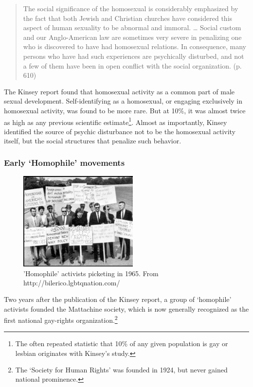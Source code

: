 \begin{quote}

The social significance of the homosexual is considerably emphasized by the fact that both Jewish and Christian churches have considered this aspect of human sexuality to be abnormal and immoral. {\ldots} Social custom and our Anglo-American law are sometimes very severe in penalizing one who is discovered to have had homosexual relations. In consequence, many persons who have had such experiences are psychically disturbed, and not a few of them have been in open conflict with the social organization. (p. 610)
\end{quote}

The Kinsey report found that homosexual activity as a common part of male sexual development. Self-identifying as a homosexual, or engaging exclusively in homosexual activity, was found to be more rare. But at 10\%, it was almost twice as high as any previous scientific estimate\footnote{The often repeated statistic that 10\% of any given population is gay or lesbian originates with Kinsey's study.}. Almost as importantly, Kinsey identified the source of psychic disturbance not to be the homosexual activity itself, but the social structures that penalize such behavior.

\subsubsection{Early `Homophile' movements}
\label{earlyhomophilemovements}

\begin{figure}[h]
 \centering

 \includegraphics{../images/1965-gay-Picket-thumb-225x186-17508.png}
 \caption{'Homophile' activists picketing in 1965. From http://bilerico.lgbtqnation.com/}
\label{fig: 1965Picket}
\end{figure}


Two years after the publication of the Kinsey report, a group of `homophile' activists founded the Mattachine society, which is now generally recognized as the first national gay-rights organization.\footnote{The `Society for Human Rights' was founded in 1924, but never gained national prominence.}

